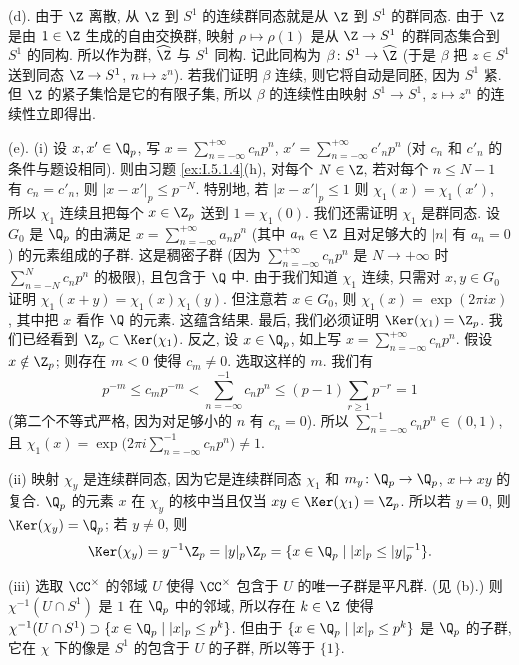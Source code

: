 \begin{solution}
(d). 由于 $\Z$ 离散, 从 $\Z$ 到 $S^1$ 的连续群同态就是从 $\Z$ 到 $S^1$ 的群同态. 由于 $\Z$ 是由 $1 \in \Z$ 生成的自由交换群, 映射 $\rho \longmapsto \rho(1)$ 是从 $\Z \to S^1$ 的群同态集合到 $S^1$ 的同构. 所以作为群, $\widehat{\Z}$ 与 $S^1$ 同构. 记此同构为 $\beta \colon S^1 \to \widehat{\Z}$ (于是 $\beta$ 把 $z \in S^1$ 送到同态 $\Z \to S^1$, $n \longmapsto z^n$). 若我们证明 $\beta$ 连续, 则它将自动是同胚, 因为 $S^1$ 紧. 但 $\Z$ 的紧子集恰是它的有限子集, 所以 $\beta$ 的连续性由映射 $S^1 \to S^1$, $z \longmapsto z^n$ 的连续性立即得出.

(e). (i) 设 $x, x' \in \Q_p$, 写 $x = \sum_{n=-\infty}^{+\infty}c_np^n$, $x' = \sum_{n=-\infty}^{+\infty}c'_np^n$ (对 $c_n$ 和 $c'_n$ 的条件与题设相同). 则由习题 \ref{ex:I.5.1.4}(h), 对每个 $N \in \Z$, 若对每个 $n \leq N - 1$ 有 $c_n = c'_n$, 则 $|x - x'|_p \leq p^{-N}$. 特别地, 若 $|x - x'|_p \leq 1$ 则 $\chi_1(x) = \chi_1(x')$, 所以 $\chi_1$ 连续且把每个 $x \in \Z_p$ 送到 $1 = \chi_1(0)$.
我们还需证明 $\chi_1$ 是群同态. 设 $G_0$ 是 $\Q_p$ 的由满足 $x = \sum_{n=-\infty}^{+\infty}a_np^n$ (其中 $a_n \in \Z$ 且对足够大的 $|n|$ 有 $a_n = 0$) 的元素组成的子群. 这是稠密子群 (因为 $\sum_{n=-\infty}^{+\infty}c_np^n$ 是 $N \to +\infty$ 时 $\sum_{n=-N}^{N}c_np^n$ 的极限), 且包含于 $\Q$ 中. 由于我们知道 $\chi_1$ 连续, 只需对 $x, y \in G_0$ 证明 $\chi_1(x + y) = \chi_1(x)\chi_1(y)$. 但注意若 $x \in G_0$, 则 $\chi_1(x) = \exp(2\pi ix)$, 其中把 $x$ 看作 $\Q$ 的元素. 这蕴含结果.
最后, 我们必须证明 $\Ker(\chi_1) = \Z_p$. 我们已经看到 $\Z_p \subset \Ker(\chi_1)$. 反之, 设 $x \in \Q_p$, 如上写 $x = \sum_{n=-\infty}^{+\infty}c_np^n$. 假设 $x \notin \Z_p$; 则存在 $m < 0$ 使得 $c_m \neq 0$. 选取这样的 $m$. 我们有
\[
p^{-m} \leq c_mp^{-m} < \sum_{n=-\infty}^{-1}c_np^n \leq (p - 1)\sum_{r \geq 1}p^{-r} = 1
\]
(第二个不等式严格, 因为对足够小的 $n$ 有 $c_n = 0$). 所以 $\sum_{n=-\infty}^{-1}c_np^n \in (0, 1)$, 且 $\chi_1(x) = \exp\bigl(2\pi i\sum_{n=-\infty}^{-1}c_np^n\bigr) \neq 1$.

(ii) 映射 $\chi_y$ 是连续群同态, 因为它是连续群同态 $\chi_1$ 和 $m_y \colon \Q_p \to \Q_p$, $x \longmapsto xy$ 的复合. $\Q_p$ 的元素 $x$ 在 $\chi_y$ 的核中当且仅当 $xy \in \Ker(\chi_1) = \Z_p$. 所以若 $y = 0$, 则 $\Ker(\chi_y) = \Q_p$; 若 $y \neq 0$, 则
\[
\Ker(\chi_y) = y^{-1}\Z_p = |y|_p\Z_p = \{x \in \Q_p \mid |x|_p \leq |y|_p^{-1}\}.
\]

(iii) 选取 $\CC^{\times}$ 的邻域 $U$ 使得 $\CC^{\times}$ 包含于 $U$ 的唯一子群是平凡群. (见 (b).) 则 $\chi^{-1}(U \cap S^1)$ 是 $1$ 在 $\Q_p$ 中的邻域, 所以存在 $k \in \Z$ 使得 $\chi^{-1}(U \cap S^1) \supset \{x \in \Q_p \mid |x|_p \leq p^k\}$. 但由于 $\{x \in \Q_p \mid |x|_p \leq p^k\}$ 是 $\Q_p$ 的子群, 它在 $\chi$ 下的像是 $S^1$ 的包含于 $U$ 的子群, 所以等于 $\{1\}$.


\end{solution}
